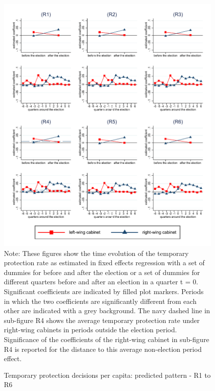 \documentclass[11pt,a4paper]{scrartcl}
\begin{document}
\clearpage
\FloatBarrier
\begin{figure}[!ht]
	\caption{Temporary protection decisions per capita: predicted pattern - R1 to R6}
	\includegraphics[width=1\textwidth]{../results/decisions/temporary_protection_rate_graphs_R1-R6.pdf}
	\scriptsize{Note: These figures show the time evolution of the temporary protection rate as estimated in fixed effects regression with a set of dummies for before and after the election or a set of dummies for different quarters before and after an election in a quarter t = 0. Significant coefficients are indicated by filled plot markers. Periods in which the two coefficients are significantly different from each other are indicated with a grey background. The navy dashed line in sub-figure R4 shows the average temporary protection rate under right-wing cabinets in periods outside the election period. Significance of the coefficients of the right-wing cabinet in sub-figure R4 is reported for the distance to this average non-election period effect.}
\end{figure}

\clearpage
\FloatBarrier


\end{document}

